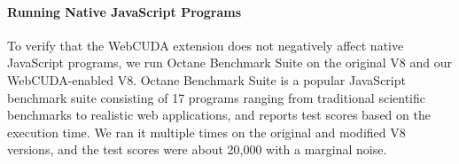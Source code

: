 \paragraph{Running Native JavaScript Programs}
To verify that the WebCUDA extension does not negatively affect native JavaScript programs, we run Octane Benchmark Suite on the original V8 and our WebCUDA-enabled V8. Octane Benchmark Suite is a popular JavaScript benchmark suite consisting of 17 programs ranging from traditional scientific benchmarks to realistic web applications, and reports test scores based on the execution time. We ran it multiple times on the original and modified V8 versions, and the test scores were about 20,000
with a marginal noise.
